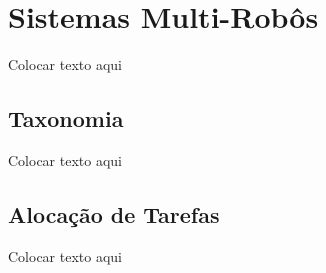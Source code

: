 \chapter[Sistemas Multi-Robôs]{Sistemas Multi-Robôs} \label{cap:cap2}
Colocar texto aqui 

\section{Taxonomia} \label{sec:sec2_1}
Colocar texto aqui

\section{Alocação de Tarefas} \label{sec:sec2_2}
Colocar texto aqui
